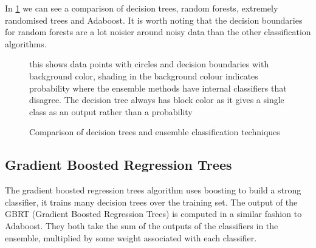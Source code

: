 \documentclass[ %
                    author={Sam Phippen},
                supervisor={Dr. Rafal Bogacz},
                     title={Real time voice activity detectors in noisy personal computing environments},
                  subtitle={},
                    degree={MEng},
                      year={2012} ]{thesis}
\begin{document}
In \ref{fig:comparison} we can see a comparison of decision trees, random forests,
extremely randomised trees and Adaboost. It is worth noting that the decision
boundaries for random forests are a lot noisier around noisy data than the
other classification algorithms.

\begin{figure}
    \label{fig:comparison}

    \caption{Comparison
    of decision trees and ensemble classification techniques}

    this shows data points with circles and decision boundaries with background
    color, shading in the background colour indicates probability where the
    ensemble methods have internal classifiers that disagree. The decision tree
    always has block color as it gives a single class as an output rather than
    a probability

\end{figure}

\subsection{Gradient Boosted Regression Trees}

The gradient boosted regression trees algorithm uses boosting to build a strong
classifier, it trains many decision trees over the training set.  The output of
the GBRT (Gradient Boosted Regression Trees) is computed in a similar fashion
to Adaboost. They both take the sum of the outputs of the classifiers in the
ensemble, multiplied by some weight associated with each classifier. 
\end{document}

